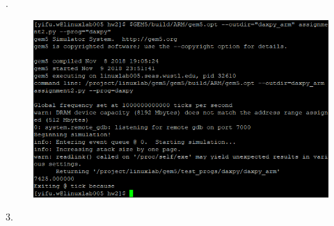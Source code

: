 \documentclass{article}
\begin{document}
.
\begin{figure}[H]\centering\includegraphics{01.png}\end{figure}
3.

  
\end{document}
